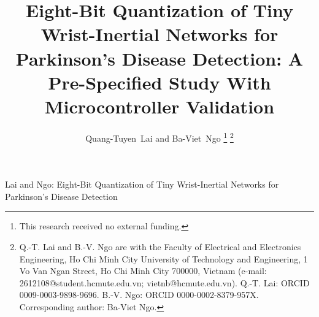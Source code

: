 \documentclass[journal,twoside,web]{ieeecolor}
\begin{document}
\title{Eight-Bit Quantization of Tiny Wrist-Inertial Networks for Parkinson's Disease Detection: A Pre-Specified Study With Microcontroller Validation}

\author{\mbox{Quang-Tuyen Lai} and \mbox{Ba-Viet Ngo}
\thanks{This research received no external funding.}%
\thanks{Q.-T. Lai and B.-V. Ngo are with the Faculty of Electrical and Electronics Engineering, Ho Chi Minh City University of Technology and Engineering, 1 Vo Van Ngan Street, Ho Chi Minh City 700000, Vietnam (e-mail: 2612108@student.hcmute.edu.vn; vietnb@hcmute.edu.vn). Q.-T. Lai: ORCID 0009-0003-9898-9696. B.-V. Ngo: ORCID 0000-0002-8379-957X. Corresponding author: Ba-Viet Ngo.}}

%
{Lai and Ngo: Eight-Bit Quantization of Tiny Wrist-Inertial Networks for Parkinson's Disease Detection}

\maketitle
\end{document}
